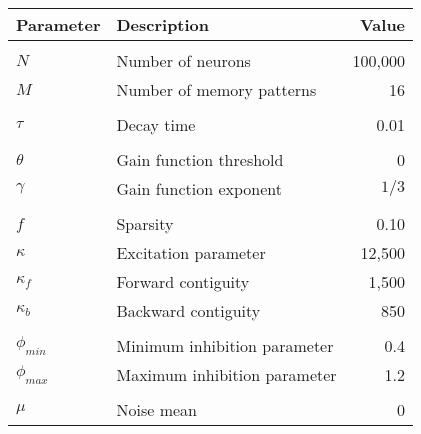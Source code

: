 \begin{table}
\begin{center}
    \begin{tabular}{l l r}
        Parameter & Description & Value \\
        \hline %
        \\
        \(N\) & Number of neurons & 100,000  \\
        \(M\) & Number of memory patterns & 16 \\
        \\
        \(\tau\) & Decay time & 0.01 \\
        \\
        \(\theta\) & Gain function threshold & 0 \\
        \(\gamma\) & Gain function exponent & \(1/3\) \\%
        \\
        \(f\) & Sparsity & 0.10 \\
        \(\kappa\) & Excitation parameter & 12,500 \\
        \(\kappa_{f}\) & Forward contiguity & 1,500 \\
        \(\kappa_{b}\) & Backward contiguity & 850 \\
        \\
        \(\phi_{min}\) & Minimum inhibition parameter & 0.4 \\
        \(\phi_{max}\) & Maximum inhibition parameter & 1.2 \\
        \\
        \(\mu\) & Noise mean & 0 \\

\end{tabular}
\end{center}
\end{table}

